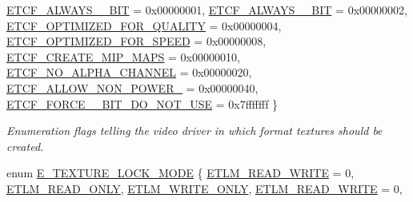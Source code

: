 \begin{DoxyCompactItemize}
\newline
\hyperlink{namespaceirr_1_1video_acaf6f7414534f7d62bff18c5bf11876fabecb9e1d0b012d6393809a80e0041bf8}{E\+T\+C\+F\+\_\+\+A\+L\+W\+A\+Y\+S\+\_\+\_\+\+B\+IT} = 0x00000001, 
\hyperlink{namespaceirr_1_1video_acaf6f7414534f7d62bff18c5bf11876fadc16ca39b451f846d5611ac2b213620a}{E\+T\+C\+F\+\_\+\+A\+L\+W\+A\+Y\+S\+\_\+\_\+\+B\+IT} = 0x00000002, 
\hyperlink{namespaceirr_1_1video_acaf6f7414534f7d62bff18c5bf11876fa3d670628725ec4086237cbaf35b619d8}{E\+T\+C\+F\+\_\+\+O\+P\+T\+I\+M\+I\+Z\+E\+D\+\_\+\+F\+O\+R\+\_\+\+Q\+U\+A\+L\+I\+TY} = 0x00000004, 
\hyperlink{namespaceirr_1_1video_acaf6f7414534f7d62bff18c5bf11876faf43ab5c00fdf773dfeae1ed6380a662a}{E\+T\+C\+F\+\_\+\+O\+P\+T\+I\+M\+I\+Z\+E\+D\+\_\+\+F\+O\+R\+\_\+\+S\+P\+E\+ED} = 0x00000008, 
\newline
\hyperlink{namespaceirr_1_1video_acaf6f7414534f7d62bff18c5bf11876fa17c818cc743db8a0d9d991911812e4a0}{E\+T\+C\+F\+\_\+\+C\+R\+E\+A\+T\+E\+\_\+\+M\+I\+P\+\_\+\+M\+A\+PS} = 0x00000010, 
\hyperlink{namespaceirr_1_1video_acaf6f7414534f7d62bff18c5bf11876fa651fbb01805b4b9ec17f79eadfe11863}{E\+T\+C\+F\+\_\+\+N\+O\+\_\+\+A\+L\+P\+H\+A\+\_\+\+C\+H\+A\+N\+N\+EL} = 0x00000020, 
\hyperlink{namespaceirr_1_1video_acaf6f7414534f7d62bff18c5bf11876faa2ab03667e399d581bd0a612eec6c281}{E\+T\+C\+F\+\_\+\+A\+L\+L\+O\+W\+\_\+\+N\+O\+N\+\_\+\+P\+O\+W\+E\+R\+\_} = 0x00000040, 
\hyperlink{namespaceirr_1_1video_acaf6f7414534f7d62bff18c5bf11876fa38ea0c1f596277976d32ec70113443b0}{E\+T\+C\+F\+\_\+\+F\+O\+R\+C\+E\+\_\+\_\+\+B\+I\+T\+\_\+\+D\+O\+\_\+\+N\+O\+T\+\_\+\+U\+SE} = 0x7fffffff
 \}\begin{DoxyCompactList}\small\item\em Enumeration flags telling the video driver in which format textures should be created. \end{DoxyCompactList}
\item 
enum \hyperlink{namespaceirr_1_1video_a3916d259e8fe0d0d02e8ee0adc8af5bc}{E\+\_\+\+T\+E\+X\+T\+U\+R\+E\+\_\+\+L\+O\+C\+K\+\_\+\+M\+O\+DE} \{ \newline
\hyperlink{namespaceirr_1_1video_a3916d259e8fe0d0d02e8ee0adc8af5bcad742bd0e885e6a08c86b8d3d5c601952}{E\+T\+L\+M\+\_\+\+R\+E\+A\+D\+\_\+\+W\+R\+I\+TE} = 0, 
\hyperlink{namespaceirr_1_1video_a3916d259e8fe0d0d02e8ee0adc8af5bcac93387433366481313cc5a3ac4a8433d}{E\+T\+L\+M\+\_\+\+R\+E\+A\+D\+\_\+\+O\+N\+LY}, 
\hyperlink{namespaceirr_1_1video_a3916d259e8fe0d0d02e8ee0adc8af5bcaed6cea09a8a6ecc64d6001b17f1af0a8}{E\+T\+L\+M\+\_\+\+W\+R\+I\+T\+E\+\_\+\+O\+N\+LY}, 
\hyperlink{namespaceirr_1_1video_a3916d259e8fe0d0d02e8ee0adc8af5bcad742bd0e885e6a08c86b8d3d5c601952}{E\+T\+L\+M\+\_\+\+R\+E\+A\+D\+\_\+\+W\+R\+I\+TE} = 0, 

\end{DoxyCompactItemize}
